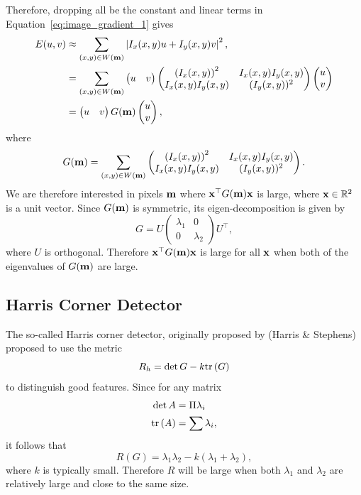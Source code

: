 Therefore, dropping all be the constant and linear terms in Equation~\eqref{eq:image_gradient_1} gives
\begin{align*}
E(u,v) &\approx \sum_{(x,y)\in W(\mathbf{m})} \left|I_x(x,y)u +I_y(x,y) v \right|^2,\\
&= \sum_{(x,y)\in W(\mathbf{m})} \begin{pmatrix} u & v \end{pmatrix}\begin{pmatrix}\left(I_x(x,y)\right)^2 & I_x(x,y) I_y(x,y) \\
I_x(x,y)I_y(x,y) & (I_y(x,y))^2 \end{pmatrix}\begin{pmatrix}u \\ v\end{pmatrix} \\
&= \begin{pmatrix} u & v \end{pmatrix} G(\mathbf{m}) \begin{pmatrix}u \\ v\end{pmatrix},
\end{align*}
where
\begin{equation}\label{eq:G_mbf}
G(\mbf) = \sum_{(x,y)\in W(\mbf)} \begin{pmatrix}\left(I_x(x,y)\right)^2 & I_x(x,y) I_y(x,y) \\
I_x(x,y)I_y(x,y) & (I_y(x,y))^2 \end{pmatrix}.
\end{equation}
We are therefore interested in pixels $\mathbf{m}$ where $\mathbf{x}^\top G(\mathbf{m}) \mathbf{x}$ is large, where $\mathbf{x}\in\mathbb{R}^2$ is a unit vector.  Since $G(\mathbf{m})$ is symmetric, its eigen-decomposition is given by
\[
G = U\begin{pmatrix} \lambda_1 & 0 \\ 0 & \lambda_2 \end{pmatrix} U^\top,
\] 
where $U$ is orthogonal.  Therefore $\mathbf{x}^\top G(\mathbf{m}) \mathbf{x}$ is large for all $\mathbf{x}$ when both of the eigenvalues of $G(\mathbf{m})$ are large.  

\subsection{Harris Corner Detector}
The so-called Harris corner detector, originally proposed by (Harris \& Stephens)\cite{HarrisStephen88} proposed to use the metric
\[
R_h = \det{G} - k\text{tr}\left(G\right)
\]
to distinguish good features.  
Since for any matrix
\begin{align*}
\det{A} &= \Pi \lambda_i \\
\text{tr}\left(A\right) &= \sum \lambda_i,
\end{align*}
it follows that 
\[
R(G) = \lambda_1\lambda_2 - k(\lambda_1+\lambda_2),
\]
where $k$ is typically small.  Therefore $R$ will be large when both $\lambda_1$ and $\lambda_2$ are relatively large and close to the same size.


